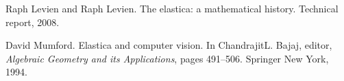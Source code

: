 \documentclass[longbibliography]{revtex4-1}
\begin{document}
\begin{thebibliography}{1}

Raph Levien and Raph Levien.
\newblock The elastica: a mathematical history.
\newblock Technical report, 2008.

David Mumford.
\newblock Elastica and computer vision.
\newblock In ChandrajitL. Bajaj, editor, {\em Algebraic Geometry and its
  Applications}, pages 491--506. Springer New York, 1994.

\end{thebibliography}
\end{document}
